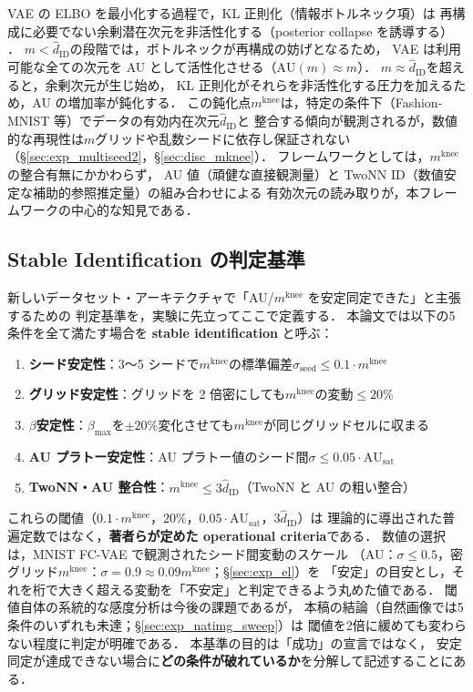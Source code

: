 \documentclass[11pt,a4paper]{jsarticle}
\newcommand{\AUsat}{\mathrm{AU}_{\mathrm{sat}}}
\newcommand{\mknee}{m^{\mathrm{knee}}}
\begin{document}
VAE の ELBO を最小化する過程で，KL 正則化（情報ボトルネック項）は
再構成に必要でない余剰潜在次元を非活性化する（posterior collapse を誘導する）
\cite{lucas2019elbo,higgins2017betavae}．
$m < \hat{d}_\mathrm{ID}$の段階では，ボトルネックが再構成の妨げとなるため，
VAE は利用可能な全ての次元を AU として活性化させる（$\mathrm{AU}(m) \approx m$）．
$m \approx \hat{d}_\mathrm{ID}$を超えると，余剰次元が生じ始め，
KL 正則化がそれらを非活性化する圧力を加えるため，AU の増加率が鈍化する．
この鈍化点$\mknee$は，特定の条件下（Fashion-MNIST 等）でデータの有効内在次元$\hat{d}_\mathrm{ID}$と
整合する傾向が観測されるが，数値的な再現性は$m$グリッドや乱数シードに依存し保証されない
（§\ref{sec:exp_multiseed2}，§\ref{sec:disc_mknee}）．
フレームワークとしては，$\mknee$の整合有無にかかわらず，
AU 値（頑健な直接観測量）と TwoNN ID（数値安定な補助的参照推定量）の組み合わせによる
有効次元の読み取りが，本フレームワークの中心的な知見である．

\subsection{Stable Identification の判定基準}\label{sec:natimg_stable_id}

新しいデータセット・アーキテクチャで「AU/$\mknee$ を安定同定できた」と主張するための
判定基準を，実験に先立ってここで定義する．
本論文では以下の5条件を全て満たす場合を \textbf{stable identification} と呼ぶ：

\begin{enumerate}
  \item \textbf{シード安定性}：3〜5 シードで$\mknee$の標準偏差$\sigma_\mathrm{seed} \leq 0.1 \cdot \mknee$
  \item \textbf{グリッド安定性}：グリッドを 2 倍密にしても$\mknee$の変動$\leq 20\%$
  \item \textbf{$\beta$安定性}：$\beta_{\max}$を$\pm 20\%$変化させても$\mknee$が同じグリッドセルに収まる
  \item \textbf{AU プラトー安定性}：AU プラトー値のシード間$\sigma \leq 0.05 \cdot \AUsat$
  \item \textbf{TwoNN・AU 整合性}：$\mknee \leq 3 \hat{d}_\mathrm{ID}$（TwoNN と AU の粗い整合）
\end{enumerate}

これらの閾値（$0.1\cdot\mknee$，$20\%$，$0.05\cdot\AUsat$，$3\hat{d}_\mathrm{ID}$）は
理論的に導出された普遍定数ではなく，\textbf{著者らが定めた operational criteria}である．
数値の選択は，MNIST FC-VAE で観測されたシード間変動のスケール
（AU：$\sigma \leq 0.5$，密グリッド$\mknee$：$\sigma = 0.9 \approx 0.09\mknee$；§\ref{sec:exp_el}）を
「安定」の目安とし，それを桁で大きく超える変動を「不安定」と判定できるよう丸めた値である．
閾値自体の系統的な感度分析は今後の課題であるが，
本稿の結論（自然画像では5条件のいずれも未達；§\ref{sec:exp_natimg_sweep}）は
閾値を2倍に緩めても変わらない程度に判定が明確である．
本基準の目的は「成功」の宣言ではなく，
安定同定が達成できない場合に\textbf{どの条件が破れているか}を分解して記述することにある．
\end{document}
